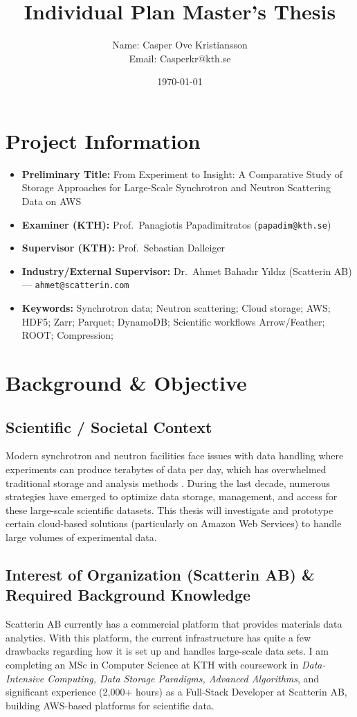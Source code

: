 \documentclass{article}
\title{Individual Plan Master's Thesis}
\author{Name: Casper Ove Kristiansson\\Email: Casperkr@kth.se}
\date{\today}
\begin{document}
\setlength\parindent{0pt}
\maketitle

\section{Project Information}
\begin{itemize}
  \item \textbf{Preliminary Title:} From Experiment to Insight: A Comparative Study of Storage Approaches for Large-Scale Synchrotron and Neutron Scattering Data on AWS
  \item \textbf{Examiner (KTH):} Prof.\ Panagiotis Papadimitratos (\texttt{papadim@kth.se})
  \item \textbf{Supervisor (KTH):} Prof.\ Sebastian Dalleiger
  \item \textbf{Industry/External Supervisor:} Dr.\ Ahmet Bahadır Yıldız (Scatterin AB) — \texttt{ahmet@scatterin.com}
  \item \textbf{Keywords:} Synchrotron data; Neutron scattering; Cloud storage; AWS; HDF5; Zarr; Parquet;  DynamoDB;  Scientific workflows Arrow/Feather; ROOT; Compression;
\end{itemize}




\section{Background \& Objective}
\subsection{Scientific / Societal Context}
Modern synchrotron and neutron facilities face issues with data handling where experiments can produce terabytes of data per day, which has overwhelmed traditional storage and analysis methods \cite{wang2018synchrotron}. During the last decade, numerous strategies have emerged to optimize data storage, management, and access for these large-scale scientific datasets. This thesis will investigate and prototype certain cloud-based solutions (particularly on Amazon Web Services) to handle large volumes of experimental data.

\subsection{Interest of Organization (Scatterin AB) \& Required Background Knowledge}
Scatterin AB currently has a commercial platform that provides materials data analytics. With this platform, the current infrastructure has quite a few drawbacks regarding how it is set up and handles large-scale data sets. I am completing an MSc in Computer Science at KTH with coursework in \emph{Data-Intensive Computing, Data Storage Paradigms, Advanced Algorithms}, and significant experience (2,000+ hours) as a Full-Stack Developer at Scatterin AB, building AWS-based platforms for scientific data.
\end{document}
